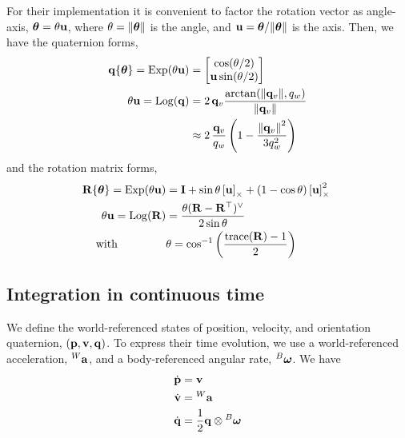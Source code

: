 For their implementation it is convenient to factor the rotation vector as angle-axis, ${{\bm \theta}}=\theta{\bf u}$, where $\theta={\left\|{{\bm \theta}}\right\|}$ is the angle, and ${\bf u}={{\bm \theta}}/{\left\|{{\bm \theta}}\right\|}$ is the axis. Then, we have the quaternion forms,
%
\begin{subequations}
\begin{align}
{\bf q}\{{{\bm \theta}}\} = \operatorname*{Exp}(\theta{\bf u}) &= \begin{bmatrix}
\cos(\theta/2) \\ {\bf u}\sin(\theta/2)
\end{bmatrix} \\
\theta{\bf u} = \operatorname*{Log}({\bf q}) &= 2\,{{\bf q}_v}\frac{\arctan({{\left\|{{\bf q}_v}\right\|},q_w})}{{\left\|{{\bf q}_v}\right\|}} \\
&\approx 2\,\frac{{{\bf q}_v}}{q_w} \left(1 - \frac{{\left\|{{\bf q}_v}\right\|}^2}{3q_w^2}\right) \label{equ:log_q_small}
\end{align}
\end{subequations}
%
and the rotation matrix forms,
%
\begin{subequations}
\begin{align}
{\bf R}\{{{\bm \theta}}\} = \operatorname*{Exp}(\theta{\bf u}) &= {\bf I} + \sin\theta\left[{\bf u}\right]_\times + (1-\cos\theta)\left[{\bf u}\right]_\times^2~ \label{equ:rodrigues} \\
\theta{\bf u} = \operatorname*{Log}({\bf R}) &= \frac{\theta({\bf R}-{\bf R}^{\top})^\vee}{2\sin\theta} \\
\textrm{ with ~~~~~~~~~~~~} &\theta=\cos^{-1}\left(\frac{\operatorname*{trace}({\bf R})-1}{2}\right) 
\end{align}
\end{subequations}

\subsection{Integration in continuous time}

We define the world-referenced states of position, velocity, and orientation quaternion, $({\bf p},{\bf v},{\bf q})$. 
%
To express their time evolution, we use a world-referenced acceleration, ${}^W{\bf a}$, and a body-referenced angular rate, ${}^B{{\bm \omega}}$. 
We have
%
\begin{align}\label{equ:cont_basic}
\dot{{\bf p}} &= {\bf v} \\
\dot{{\bf v}} &= {}^W{\bf a} \\
\dot{{\bf q}} &= \frac12{\bf q}\otimes{}^B{{\bm \omega}} 
\end{align}
%

